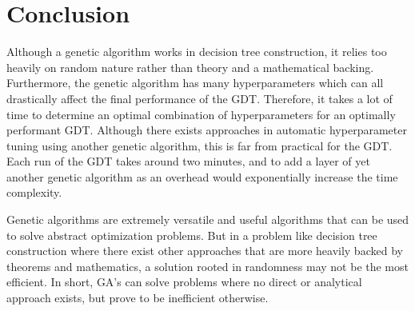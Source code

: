 \documentclass[12pt]{article}
\begin{document}
\section{Conclusion}

Although a genetic algorithm works in decision tree construction, it relies too heavily on random nature rather than theory and a mathematical backing. Furthermore, the genetic algorithm has many hyperparameters which can all drastically affect the final performance of the GDT. Therefore, it takes a lot of time to determine an optimal combination of hyperparameters for an optimally performant GDT. Although there exists approaches in automatic hyperparameter tuning using another genetic algorithm, this is far from practical for the GDT. Each run of the GDT takes around two minutes, and to add a layer of yet another genetic algorithm as an overhead would exponentially increase the time complexity.

Genetic algorithms are extremely versatile and useful algorithms that can be used to solve abstract optimization problems. But in a problem like decision tree construction where there exist other approaches that are more heavily backed by theorems and mathematics, a solution rooted in randomness may not be the most efficient. In short, GA's can solve problems where no direct or analytical approach exists, but prove to be inefficient otherwise.

\newpage
\printbibliography[heading=bibintoc] %
\end{document}
